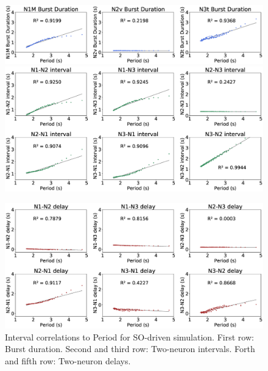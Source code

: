 \begin{figure}[h!]
    \centering
\includegraphics[width=\textwidth]{img/results-paper-modelo/figure10_row1.eps}
  \includegraphics[width=\textwidth]{img/results-paper-modelo/figure10_row2-3.eps}
      
  \includegraphics[width=\textwidth]{img/results-paper-modelo/figure10_row4-5.eps}%

    \caption{Interval correlations to Period for SO-driven simulation. First row: Burst duration. Second and third row: Two-neuron intervals. Forth and fifth row: Two-neuron delays.}
    \label{fig:invariant so test19}
\end{figure}

